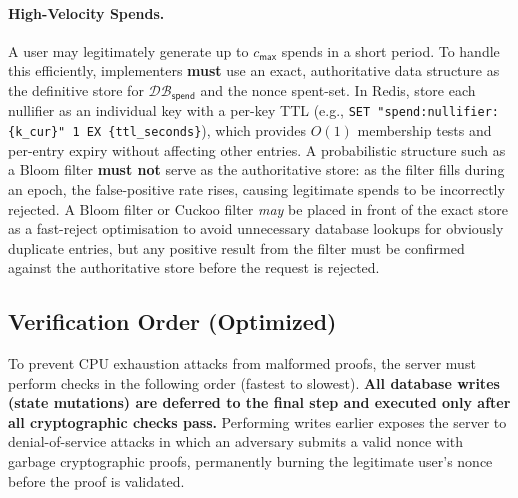 \documentclass[11pt]{article}
\theoremstyle{definitionstyle}
\theoremstyle{plain}
\newcommand{\DB}{\mathcal{DB}}
\begin{document}
\paragraph{High-Velocity Spends.}
A user may legitimately generate up to $c_{\mathsf{max}}$ spends in a short period. To handle this efficiently, implementers \textbf{must} use an exact, authoritative data structure as the definitive store for $\DB_{\mathsf{spend}}$ and the nonce spent-set. In Redis, store each nullifier as an individual key with a per-key TTL (e.g., \texttt{SET "spend:nullifier:\{k\_cur\}" 1 EX \{ttl\_seconds\}}), which provides $O(1)$ membership tests and per-entry expiry without affecting other entries. A probabilistic structure such as a Bloom filter \textbf{must not} serve as the authoritative store: as the filter fills during an epoch, the false-positive rate rises, causing legitimate spends to be incorrectly rejected. A Bloom filter or Cuckoo filter \emph{may} be placed in front of the exact store as a fast-reject optimisation to avoid unnecessary database lookups for obviously duplicate entries, but any positive result from the filter must be confirmed against the authoritative store before the request is rejected.

\subsection{Verification Order (Optimized)}

To prevent CPU exhaustion attacks from malformed proofs, the server must perform checks in the following order (fastest to slowest). \textbf{All database writes (state mutations) are deferred to the final step and executed only after all cryptographic checks pass.} Performing writes earlier exposes the server to denial-of-service attacks in which an adversary submits a valid nonce with garbage cryptographic proofs, permanently burning the legitimate user's nonce before the proof is validated.
\end{document}
